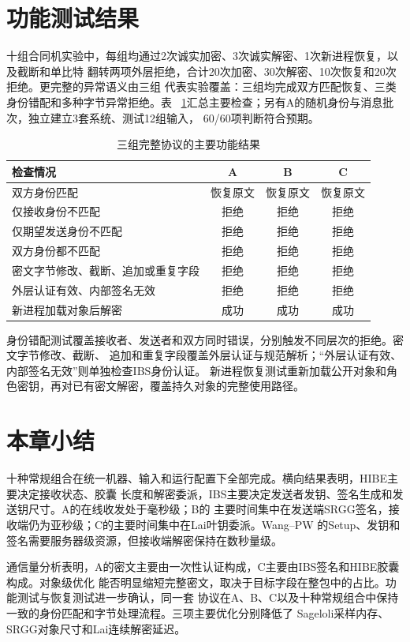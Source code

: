 \section{功能测试结果}
十组合同机实验中，每组均通过2次诚实加密、3次诚实解密、1次新进程恢复，以及截断和单比特
翻转两项外层拒绝，合计20次加密、30次解密、10次恢复和20次拒绝。更完整的异常语义由三组
代表实验覆盖：三组均完成双方匹配恢复、三类身份错配和多种字节异常拒绝。表
~\ref{tab:functional}汇总主要检查；另有A的随机身份与消息批次，独立建立3套系统、测试12组输入，
60/60项判断符合预期。

\begin{table}[H]
\centering\small
\caption{三组完整协议的主要功能结果}
\label{tab:functional}
\begin{tabularx}{\textwidth}{@{}Xccc@{}}
\toprule
\rowcolor{black!8} 检查情况 & A & B & C \\
\midrule
双方身份匹配 & 恢复原文 & 恢复原文 & 恢复原文 \\
仅接收身份不匹配 & 拒绝 & 拒绝 & 拒绝 \\
仅期望发送身份不匹配 & 拒绝 & 拒绝 & 拒绝 \\
双方身份都不匹配 & 拒绝 & 拒绝 & 拒绝 \\
密文字节修改、截断、追加或重复字段 & 拒绝 & 拒绝 & 拒绝 \\
外层认证有效、内部签名无效 & 拒绝 & 拒绝 & 拒绝 \\
新进程加载对象后解密 & 成功 & 成功 & 成功 \\
\bottomrule
\end{tabularx}
\end{table}

身份错配测试覆盖接收者、发送者和双方同时错误，分别触发不同层次的拒绝。密文字节修改、截断、
追加和重复字段覆盖外层认证与规范解析；“外层认证有效、内部签名无效”则单独检查IBS身份认证。
新进程恢复测试重新加载公开对象和角色密钥，再对已有密文解密，覆盖持久对象的完整使用路径。

\section{本章小结}

十种常规组合在统一机器、输入和运行配置下全部完成。横向结果表明，HIBE主要决定接收状态、胶囊
长度和解密委派，IBS主要决定发送者发钥、签名生成和发送钥尺寸。A的在线收发处于毫秒级；B的
主要时间集中在发送端SRGG签名，接收端仍为亚秒级；C的主要时间集中在Lai叶钥委派。Wang--PW
的Setup、发钥和签名需要服务器级资源，但接收端解密保持在数秒量级。

通信量分析表明，A的密文主要由一次性认证构成，C主要由IBS签名和HIBE胶囊构成。对象级优化
能否明显缩短完整密文，取决于目标字段在整包中的占比。功能测试与恢复测试进一步确认，同一套
协议在A、B、C以及十种常规组合中保持一致的身份匹配和字节处理流程。三项主要优化分别降低了
Sageloli采样内存、SRGG对象尺寸和Lai连续解密延迟。

